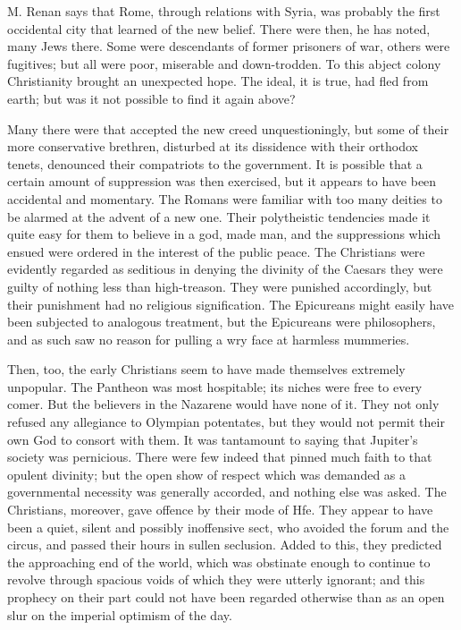\documentclass[]{book}
\begin{document}
M. Renan says that Rome, through relations with Syria, was probably the
first occidental city that learned of the new belief. There were then,
he has noted, many Jews there. Some were descendants of former prisoners
of war, others were fugitives; but all were poor, miserable and
down-trodden. To this abject colony Christianity brought an unexpected
hope. The ideal, it is true, had fled from earth; but was it not
possible to find it again above?

Many there were that accepted the new creed unquestioningly, but some of
their more conservative brethren, disturbed at its dissidence with their
orthodox tenets, denounced their compatriots to the government. It is
possible that a certain amount of suppression was then exercised, but it
appears to have been accidental and momentary. The Romans were familiar
with too many deities to be alarmed at the advent of a new one. Their
polytheistic tendencies made it quite easy for them to believe in a god,
made man, and the suppressions which ensued were ordered in the interest
of the public peace. The Christians were evidently regarded as seditious
in denying the divinity of the Caesars they were guilty of nothing less
than high-treason. They were punished accordingly, but their punishment
had no religious signification. The Epicureans might easily have been
subjected to analogous treatment, but the Epicureans were philosophers,
and as such saw no reason for pulling a wry face at harmless mummeries.

Then, too, the early Christians seem to have made themselves extremely
unpopular. The Pantheon was most hospitable; its niches were free to
every comer. But the believers in the Nazarene would have none of it.
They not only refused any allegiance to Olympian potentates, but they
would not permit their own God to consort with them. It was tantamount
to saying that Jupiter's society was pernicious. There were few indeed
that pinned much faith to that opulent divinity; but the open show of
respect which was demanded as a governmental necessity was generally
accorded, and nothing else was asked. The Christians, moreover, gave
offence by their mode of Hfe. They appear to have been a quiet, silent
and possibly inoffensive sect, who avoided the forum and the circus, and
passed their hours in sullen seclusion. Added to this, they predicted
the approaching end of the world, which was obstinate enough to continue
to revolve through spacious voids of which they were utterly ignorant;
and this prophecy on their part could not have been regarded otherwise
than as an open slur on the imperial optimism of the day.
\end{document}
